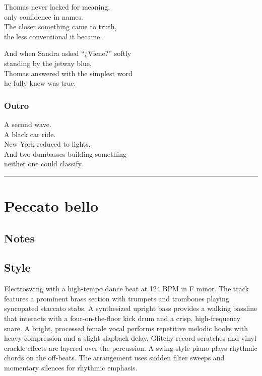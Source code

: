 \documentclass[]{article}
\begin{document}
Thomas never lacked for meaning,\\
only confidence in names.\\
The closer something came to truth,\\
the less conventional it became.

And when Sandra asked ``¿Viene?'' softly\\
standing by the jetway blue,\\
Thomas answered with the simplest word\\
he fully knew was true.

\subsubsection{Outro}\label{outro}

A second wave.\\
A black car ride.\\
New York reduced to lights.\\
And two dumbasses building something\\
neither one could classify.

\begin{center}\rule{0.5\linewidth}{0.5pt}\end{center}

\section{Peccato bello}\label{peccato-bello}

\subsection{Notes}\label{notes-14}

\subsection{Style}\label{style-14}

Electroswing with a high-tempo dance beat at 124 BPM in F minor. The
track features a prominent brass section with trumpets and trombones
playing syncopated staccato stabs. A synthesized upright bass provides a
walking bassline that interacts with a four-on-the-floor kick drum and a
crisp, high-frequency snare. A bright, processed female vocal performs
repetitive melodic hooks with heavy compression and a slight slapback
delay. Glitchy record scratches and vinyl crackle effects are layered
over the percussion. A swing-style piano plays rhythmic chords on the
off-beats. The arrangement uses sudden filter sweeps and momentary
silences for rhythmic emphasis.
\end{document}
